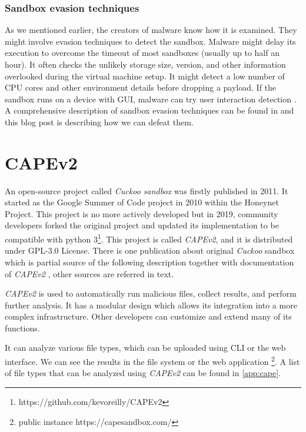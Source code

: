 \subsubsection*{Sandbox evasion techniques}
As we mentioned earlier, the creators of malware know how it is examined. They might involve evasion techniques to detect the sandbox. Malware might delay its execution to overcome the timeout of most sandboxes (usually up to half an hour). It often checks the unlikely storage size, version, and other information overlooked during the virtual machine setup. It might detect a low number of CPU cores and other environment details before dropping a payload. If the sandbox runs on a device with GUI, malware can try user interaction detection \cite{Evolutio45:online}. A comprehensive description of sandbox evasion techniques can be found in \cite{Afianian2018} and this blog post \cite{Chailytko2019} is describing how we can defeat them.

\section{CAPEv2}
An open-source project called \emph{Cuckoo sandbox} was firstly published in 2011. It started as the Google Summer of Code project in 2010 within the Honeynet Project. This project is no more actively developed but in 2019, community developers forked the original project and updated its implementation to be compatible with python 3\footnote{https://github.com/kevoreilly/CAPEv2}. This project is called \emph{CAPEv2}, and it is distributed under GPL-3.0 License. There is one publication about original \emph{Cuckoo} sandbox \cite{Oktavianto2013} which is partial source of the following description together with documentation of \emph{CAPEv2} \cite{CAPESand75:online}, other sources are referred in text.

\emph{CAPEv2} is used to automatically run malicious files, collect results, and perform further analysis. It has a modular design which allows its integration into a more complex infrastructure. Other developers can customize and extend many of its functions.

It can analyze various file types, which can be uploaded using CLI  or the web interface. We can see the results in the file system or the web application \footnote{public instance https://capesandbox.com/}. A list of file types that can be analyzed using \emph{CAPEv2} can be found in \ref{app:cape}.


